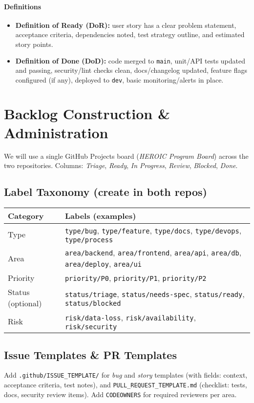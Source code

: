 \documentclass[11pt]{article}
\begin{document}
\paragraph{Definitions}
\begin{itemize}[leftmargin=1.2em]
  \item \textbf{Definition of Ready (DoR):} user story has a clear problem statement, acceptance criteria, dependencies noted, test strategy outline, and estimated story points.
  \item \textbf{Definition of Done (DoD):} code merged to \texttt{main}, unit/API tests updated and passing, security/lint checks clean, docs/changelog updated, feature flags configured (if any), deployed to \texttt{dev}, basic monitoring/alerts in place.
\end{itemize}

\section{Backlog Construction \& Administration}
We will use a single GitHub Projects board (\textit{HEROIC Program Board}) across the two repositories. Columns: \textit{Triage}, \textit{Ready}, \textit{In Progress}, \textit{Review}, \textit{Blocked}, \textit{Done}.

\subsection*{Label Taxonomy (create in both repos)}
\begin{longtable}{@{}p{3.2cm}p{10.8cm}@{}}
\toprule
\textbf{Category} & \textbf{Labels (examples)} \\
\midrule
Type & \texttt{type/bug}, \texttt{type/feature}, \texttt{type/docs}, \texttt{type/devops}, \texttt{type/process} \\
Area & \texttt{area/backend}, \texttt{area/frontend}, \texttt{area/api}, \texttt{area/db}, \texttt{area/deploy}, \texttt{area/ui} \\
Priority & \texttt{priority/P0}, \texttt{priority/P1}, \texttt{priority/P2} \\
Status (optional) & \texttt{status/triage}, \texttt{status/needs-spec}, \texttt{status/ready}, \texttt{status/blocked} \\
Risk & \texttt{risk/data-loss}, \texttt{risk/availability}, \texttt{risk/security} \\
\bottomrule
\end{longtable}

\subsection*{Issue Templates \& PR Templates}
Add \texttt{.github/ISSUE\_TEMPLATE/} for \emph{bug} and \emph{story} templates (with fields: context, acceptance criteria, test notes), and \texttt{PULL\_REQUEST\_TEMPLATE.md} (checklist: tests, docs, security review items). Add \texttt{CODEOWNERS} for required reviewers per area.
\end{document}
